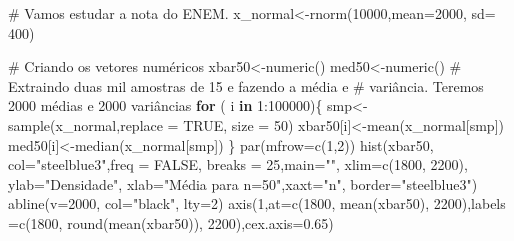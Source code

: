 \documentclass[
  letterpaper,
  DIV=11,
  numbers=noendperiod]{scrartcl}
\newenvironment{Shaded}{\begin{snugshade}}{\end{snugshade}}
\newcommand{\AttributeTok}[1]{\textcolor[rgb]{0.40,0.45,0.13}{#1}}
\newcommand{\CommentTok}[1]{\textcolor[rgb]{0.37,0.37,0.37}{#1}}
\newcommand{\ConstantTok}[1]{\textcolor[rgb]{0.56,0.35,0.01}{#1}}
\newcommand{\ControlFlowTok}[1]{\textcolor[rgb]{0.00,0.23,0.31}{\textbf{#1}}}
\newcommand{\DecValTok}[1]{\textcolor[rgb]{0.68,0.00,0.00}{#1}}
\newcommand{\FloatTok}[1]{\textcolor[rgb]{0.68,0.00,0.00}{#1}}
\newcommand{\FunctionTok}[1]{\textcolor[rgb]{0.28,0.35,0.67}{#1}}
\newcommand{\NormalTok}[1]{\textcolor[rgb]{0.00,0.23,0.31}{#1}}
\newcommand{\OtherTok}[1]{\textcolor[rgb]{0.00,0.23,0.31}{#1}}
\newcommand{\SpecialCharTok}[1]{\textcolor[rgb]{0.37,0.37,0.37}{#1}}
\newcommand{\StringTok}[1]{\textcolor[rgb]{0.13,0.47,0.30}{#1}}
\begin{document}
\begin{Shaded}
\begin{Highlighting}[]
\CommentTok{\# Vamos estudar a nota do ENEM. }
\NormalTok{x\_normal}\OtherTok{\textless{}{-}}\FunctionTok{rnorm}\NormalTok{(}\DecValTok{10000}\NormalTok{,}\AttributeTok{mean=}\DecValTok{2000}\NormalTok{, }\AttributeTok{sd=} \DecValTok{400}\NormalTok{)}

\CommentTok{\# Criando os vetores numéricos }
\NormalTok{xbar50}\OtherTok{\textless{}{-}}\FunctionTok{numeric}\NormalTok{()}
\NormalTok{med50}\OtherTok{\textless{}{-}}\FunctionTok{numeric}\NormalTok{()}
\CommentTok{\# Extraindo duas mil amostras de 15 e fazendo a média e }
\CommentTok{\# variância. Teremos 2000 médias e 2000 variâncias }
\ControlFlowTok{for}\NormalTok{ ( i }\ControlFlowTok{in} \DecValTok{1}\SpecialCharTok{:}\DecValTok{100000}\NormalTok{)\{}
\NormalTok{  smp}\OtherTok{\textless{}{-}}\FunctionTok{sample}\NormalTok{(x\_normal,}\AttributeTok{replace =} \ConstantTok{TRUE}\NormalTok{, }\AttributeTok{size =} \DecValTok{50}\NormalTok{)}
\NormalTok{  xbar50[i]}\OtherTok{\textless{}{-}}\FunctionTok{mean}\NormalTok{(x\_normal[smp])}
\NormalTok{  med50[i]}\OtherTok{\textless{}{-}}\FunctionTok{median}\NormalTok{(x\_normal[smp])}
\NormalTok{\}}
\FunctionTok{par}\NormalTok{(}\AttributeTok{mfrow=}\FunctionTok{c}\NormalTok{(}\DecValTok{1}\NormalTok{,}\DecValTok{2}\NormalTok{))}
\FunctionTok{hist}\NormalTok{(xbar50, }\AttributeTok{col=}\StringTok{"steelblue3"}\NormalTok{,}\AttributeTok{freq =} \ConstantTok{FALSE}\NormalTok{, }\AttributeTok{breaks =} \DecValTok{25}\NormalTok{,}\AttributeTok{main=}\StringTok{""}\NormalTok{,}
     \AttributeTok{xlim=}\FunctionTok{c}\NormalTok{(}\DecValTok{1800}\NormalTok{, }\DecValTok{2200}\NormalTok{), }\AttributeTok{ylab=}\StringTok{"Densidade"}\NormalTok{, }\AttributeTok{xlab=}\StringTok{"Média para n=50"}\NormalTok{,}\AttributeTok{xaxt=}\StringTok{"n"}\NormalTok{,}
     \AttributeTok{border=}\StringTok{"steelblue3"}\NormalTok{)}
\FunctionTok{abline}\NormalTok{(}\AttributeTok{v=}\DecValTok{2000}\NormalTok{, }\AttributeTok{col=}\StringTok{"black"}\NormalTok{, }\AttributeTok{lty=}\DecValTok{2}\NormalTok{)}
\FunctionTok{axis}\NormalTok{(}\DecValTok{1}\NormalTok{,}\AttributeTok{at=}\FunctionTok{c}\NormalTok{(}\DecValTok{1800}\NormalTok{, }\FunctionTok{mean}\NormalTok{(xbar50), }\DecValTok{2200}\NormalTok{),}\AttributeTok{labels =}\FunctionTok{c}\NormalTok{(}\DecValTok{1800}\NormalTok{, }\FunctionTok{round}\NormalTok{(}\FunctionTok{mean}\NormalTok{(xbar50)),}
    \DecValTok{2200}\NormalTok{),}\AttributeTok{cex.axis=}\FloatTok{0.65}\NormalTok{) }

\end{Highlighting}
\end{Shaded}
\end{document}
